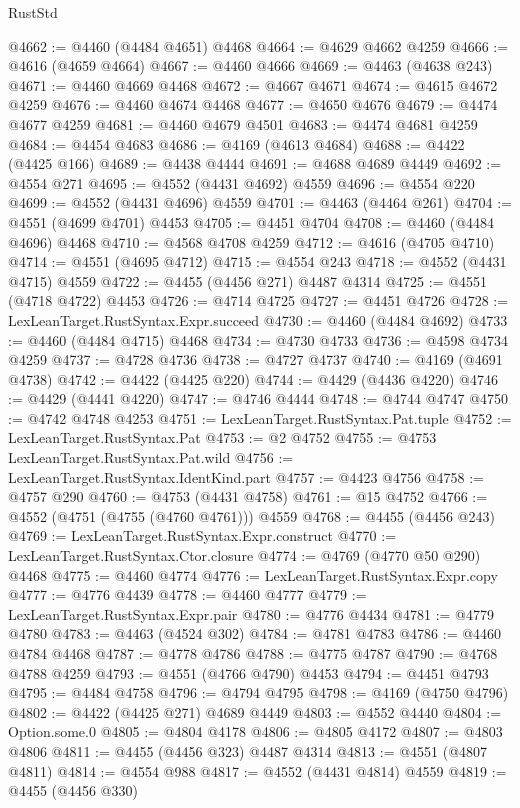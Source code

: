 \begin{lexlean}{RustStd}
\begin{coremodule}
@4662 := @4460 (@4484 @4651) @4468
@4664 := @4629 @4662 @4259
@4666 := @4616 (@4659 @4664)
@4667 := @4460 @4666
@4669 := @4463 (@4638 @243)
@4671 := @4460 @4669 @4468
@4672 := @4667 @4671
@4674 := @4615 @4672 @4259
@4676 := @4460 @4674 @4468
@4677 := @4650 @4676
@4679 := @4474 @4677 @4259
@4681 := @4460 @4679 @4501
@4683 := @4474 @4681 @4259
@4684 := @4454 @4683
@4686 := @4169 (@4613 @4684)
@4688 := @4422 (@4425 @166)
@4689 := @4438 @4444
@4691 := @4688 @4689 @4449
@4692 := @4554 @271
@4695 := @4552 (@4431 @4692) @4559
@4696 := @4554 @220
@4699 := @4552 (@4431 @4696) @4559
@4701 := @4463 (@4464 @261)
@4704 := @4551 (@4699 @4701) @4453
@4705 := @4451 @4704
@4708 := @4460 (@4484 @4696) @4468
@4710 := @4568 @4708 @4259
@4712 := @4616 (@4705 @4710)
@4714 := @4551 (@4695 @4712)
@4715 := @4554 @243
@4718 := @4552 (@4431 @4715) @4559
@4722 := @4455 (@4456 @271) @4487 @4314
@4725 := @4551 (@4718 @4722) @4453
@4726 := @4714 @4725
@4727 := @4451 @4726
@4728 := LexLeanTarget.RustSyntax.Expr.succeed
@4730 := @4460 (@4484 @4692)
@4733 := @4460 (@4484 @4715) @4468
@4734 := @4730 @4733
@4736 := @4598 @4734 @4259
@4737 := @4728 @4736
@4738 := @4727 @4737
@4740 := @4169 (@4691 @4738)
@4742 := @4422 (@4425 @220)
@4744 := @4429 (@4436 @4220)
@4746 := @4429 (@4441 @4220)
@4747 := @4746 @4444
@4748 := @4744 @4747
@4750 := @4742 @4748 @4253
@4751 := LexLeanTarget.RustSyntax.Pat.tuple
@4752 := LexLeanTarget.RustSyntax.Pat
@4753 := @2 @4752
@4755 := @4753 LexLeanTarget.RustSyntax.Pat.wild
@4756 := LexLeanTarget.RustSyntax.IdentKind.part
@4757 := @4423 @4756
@4758 := @4757 @290
@4760 := @4753 (@4431 @4758)
@4761 := @15 @4752
@4766 := @4552 (@4751 (@4755 (@4760 @4761))) @4559
@4768 := @4455 (@4456 @243)
@4769 := LexLeanTarget.RustSyntax.Expr.construct
@4770 := LexLeanTarget.RustSyntax.Ctor.closure
@4774 := @4769 (@4770 @50 @290) @4468
@4775 := @4460 @4774
@4776 := LexLeanTarget.RustSyntax.Expr.copy
@4777 := @4776 @4439
@4778 := @4460 @4777
@4779 := LexLeanTarget.RustSyntax.Expr.pair
@4780 := @4776 @4434
@4781 := @4779 @4780
@4783 := @4463 (@4524 @302)
@4784 := @4781 @4783
@4786 := @4460 @4784 @4468
@4787 := @4778 @4786
@4788 := @4775 @4787
@4790 := @4768 @4788 @4259
@4793 := @4551 (@4766 @4790) @4453
@4794 := @4451 @4793
@4795 := @4484 @4758
@4796 := @4794 @4795
@4798 := @4169 (@4750 @4796)
@4802 := @4422 (@4425 @271) @4689 @4449
@4803 := @4552 @4440
@4804 := Option.some.{0}
@4805 := @4804 @4178
@4806 := @4805 @4172
@4807 := @4803 @4806
@4811 := @4455 (@4456 @323) @4487 @4314
@4813 := @4551 (@4807 @4811)
@4814 := @4554 @988
@4817 := @4552 (@4431 @4814) @4559
@4819 := @4455 (@4456 @330)

\end{coremodule}
\end{lexlean}
